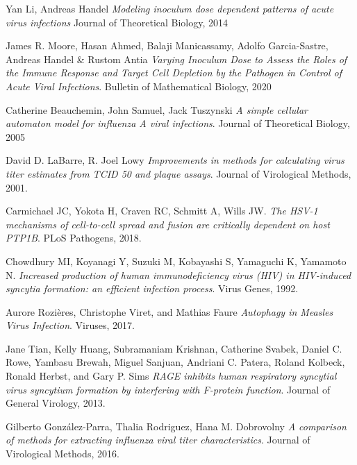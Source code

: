 \documentclass[a4paper]{article}
\begin{document}
\begin{thebibliography}{9}
Yan Li, Andreas Handel
\textit{Modeling inoculum dose dependent patterns of acute virus infections}
Journal of Theoretical Biology, 2014

James R. Moore, Hasan Ahmed, Balaji Manicassamy, Adolfo Garcia-Sastre, Andreas Handel \& Rustom Antia
\textit{Varying Inoculum Dose to Assess the Roles of the Immune Response and Target Cell Depletion by the Pathogen in Control of Acute Viral Infections}.
Bulletin of Mathematical Biology, 2020

Catherine Beauchemin, John Samuel, Jack Tuszynski
\textit{A simple cellular automaton model for influenza A viral infections}.
Journal of Theoretical Biology, 2005

David D. LaBarre, R. Joel Lowy
\textit{Improvements in methods for calculating virus titer estimates from TCID 50 and plaque assays}.
Journal of Virological Methods, 2001.

Carmichael JC, Yokota H, Craven RC, Schmitt A, Wills JW.
\textit{The HSV-1 mechanisms of cell-to-cell spread and fusion are critically dependent on host PTP1B}.
PLoS Pathogens, 2018.

Chowdhury MI, Koyanagi Y, Suzuki M, Kobayashi S, Yamaguchi K, Yamamoto N.
\textit{Increased production of human immunodeficiency virus (HIV) in HIV-induced syncytia formation: an efficient infection process}.
Virus Genes, 1992.

Aurore Rozières, Christophe Viret, and Mathias Faure
\textit{Autophagy in Measles Virus Infection}.
Viruses, 2017.

Jane Tian, Kelly Huang, Subramaniam Krishnan, Catherine Svabek, Daniel C. Rowe, Yambasu Brewah, Miguel Sanjuan, Andriani C. Patera, Roland Kolbeck, Ronald Herbst, and Gary P. Sims
\textit{RAGE inhibits human respiratory syncytial virus syncytium formation by interfering with F-protein function}.
Journal of General Virology, 2013.

Gilberto González-Parra, Thalia Rodriguez, Hana M. Dobrovolny
\textit{A comparison of methods for extracting influenza viral titer
characteristics}.
Journal of Virological Methods, 2016.

\end{thebibliography}
\end{document}
